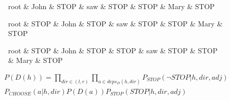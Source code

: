 \documentclass{beamer}
\begin{document}
\begin{frame}
\begin{figure}
\centering
\begin{dependency}[theme = simple]
\begin{deptext}
root \& John \& STOP \& saw \& STOP \& STOP \& Mary \& STOP \\
\end{deptext}
\end{dependency}
\end{figure}
\end{frame}

\begin{frame}
\begin{figure}
\centering
\begin{dependency}[theme = simple]
\begin{deptext}
root \& STOP \& John \& STOP \& saw \& STOP \& STOP \& Mary \& STOP \\
\end{deptext}
\end{dependency}
\end{figure}
\end{frame}

\begin{frame}
\begin{figure}
\centering
\begin{dependency}[theme = simple]
\begin{deptext}
root \& STOP \& John \& STOP \& STOP \& saw \& STOP \& STOP \& Mary \& STOP \\
\end{deptext}
\end{dependency}
\end{figure}
\end{frame}

\begin{frame}

\begin{gather*}
    P(D(h)) = \prod\limits_{dir\in(l,r)} \prod\limits_{a\in deps_D(h,dir)} P_{STOP} (\neg STOP | h, dir, adj) \\
    P_{CHOOSE}(a|h, dir) P(D(a)) P_{STOP}(STOP | h, dir, adj)
\end{gather*}

\end{frame}
\end{document}
